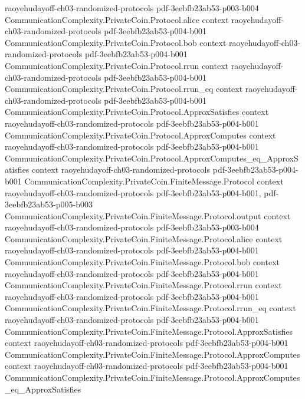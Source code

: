 \begin{theorem}
  {raoyehudayoff-ch03-randomized-protocols}
  {pdf-3eebfb23ab53-p003-b004}
\proofstep
  {CommunicationComplexity.PrivateCoin.Protocol.alice}
  {context}
  {raoyehudayoff-ch03-randomized-protocols}
  {pdf-3eebfb23ab53-p004-b001}
\proofstep
  {CommunicationComplexity.PrivateCoin.Protocol.bob}
  {context}
  {raoyehudayoff-ch03-randomized-protocols}
  {pdf-3eebfb23ab53-p004-b001}
\proofstep
  {CommunicationComplexity.PrivateCoin.Protocol.rrun}
  {context}
  {raoyehudayoff-ch03-randomized-protocols}
  {pdf-3eebfb23ab53-p004-b001}
\proofstep
  {CommunicationComplexity.PrivateCoin.Protocol.rrun_eq}
  {context}
  {raoyehudayoff-ch03-randomized-protocols}
  {pdf-3eebfb23ab53-p004-b001}
\proofstep
  {CommunicationComplexity.PrivateCoin.Protocol.ApproxSatisfies}
  {context}
  {raoyehudayoff-ch03-randomized-protocols}
  {pdf-3eebfb23ab53-p004-b001}
\proofstep
  {CommunicationComplexity.PrivateCoin.Protocol.ApproxComputes}
  {context}
  {raoyehudayoff-ch03-randomized-protocols}
  {pdf-3eebfb23ab53-p004-b001}
\proofstep
  {CommunicationComplexity.PrivateCoin.Protocol.ApproxComputes_eq_ApproxSatisfies}
  {context}
  {raoyehudayoff-ch03-randomized-protocols}
  {pdf-3eebfb23ab53-p004-b001}
\proofstep
  {CommunicationComplexity.PrivateCoin.FiniteMessage.Protocol}
  {context}
  {raoyehudayoff-ch03-randomized-protocols}
  {pdf-3eebfb23ab53-p004-b001,
    pdf-3eebfb23ab53-p005-b003}
\proofstep
  {CommunicationComplexity.PrivateCoin.FiniteMessage.Protocol.output}
  {context}
  {raoyehudayoff-ch03-randomized-protocols}
  {pdf-3eebfb23ab53-p003-b004}
\proofstep
  {CommunicationComplexity.PrivateCoin.FiniteMessage.Protocol.alice}
  {context}
  {raoyehudayoff-ch03-randomized-protocols}
  {pdf-3eebfb23ab53-p004-b001}
\proofstep
  {CommunicationComplexity.PrivateCoin.FiniteMessage.Protocol.bob}
  {context}
  {raoyehudayoff-ch03-randomized-protocols}
  {pdf-3eebfb23ab53-p004-b001}
\proofstep
  {CommunicationComplexity.PrivateCoin.FiniteMessage.Protocol.rrun}
  {context}
  {raoyehudayoff-ch03-randomized-protocols}
  {pdf-3eebfb23ab53-p004-b001}
\proofstep
  {CommunicationComplexity.PrivateCoin.FiniteMessage.Protocol.rrun_eq}
  {context}
  {raoyehudayoff-ch03-randomized-protocols}
  {pdf-3eebfb23ab53-p004-b001}
\proofstep
  {CommunicationComplexity.PrivateCoin.FiniteMessage.Protocol.ApproxSatisfies}
  {context}
  {raoyehudayoff-ch03-randomized-protocols}
  {pdf-3eebfb23ab53-p004-b001}
\proofstep
  {CommunicationComplexity.PrivateCoin.FiniteMessage.Protocol.ApproxComputes}
  {context}
  {raoyehudayoff-ch03-randomized-protocols}
  {pdf-3eebfb23ab53-p004-b001}
\proofstep
  {CommunicationComplexity.PrivateCoin.FiniteMessage.Protocol.ApproxComputes_eq_ApproxSatisfies}

\end{theorem}
